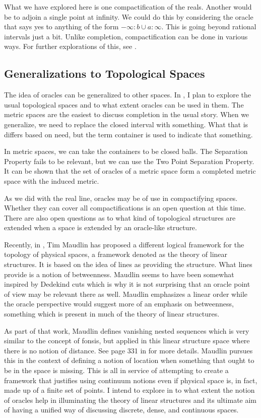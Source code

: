\documentclass[12pt]{article}
\begin{document}
What we have explored here is one compactification of the reals. Another would be to adjoin a single point at infinity. We could do this by considering the oracle that says yes to anything of the form $-\infty:b \cup a:\infty$. This is going beyond rational intervals just a bit. Unlike completion, compactification can be done in various ways. For further explorations of this, see \cite{taylor23metric}. 


\subsection{Generalizations to Topological Spaces}

The idea of oracles can be generalized to other spaces. In \cite{taylor23metric}, I plan to explore the usual topological spaces and to what extent oracles can be used in them. The metric spaces are the easiest to discuss completion in the usual story. When we generalize, we need to replace the closed interval with something. What that is differs based on need, but the term container is used to indicate that something. 

In metric spaces, we can take the containers to be closed balls. The Separation Property fails to be relevant, but we can use the Two Point Separation Property. It can be shown that the set of oracles of a metric space form a completed metric space with the induced metric. 

As we did with the real line, oracles may be of use in compactifying spaces. Whether they can cover all compactifications is an open question at this time. There are also open questions as to what kind of topological structures are extended when a space is extended by an oracle-like structure. 

Recently, in \cite{maudlin}, Tim Maudlin has proposed a different logical framework for the topology of physical spaces, a framework denoted as the theory of linear structures. It is based on the idea of lines as providing the structure. What lines provide is a notion of betweenness. Maudlin seems to have been somewhat inspired by Dedekind cuts which is why it is not surprising that an oracle point of view may be relevant there as well. Maudlin emphasizes a linear order while the oracle perspective would suggest more of an emphasis on betweenness, something which is present in much of the theory of linear structures. 

As part of that work, Maudlin defines vanishing nested sequences which is very similar to the concept of fonsis, but applied in this linear structure space where there is no notion of distance. See page 331 in \cite{maudlin} for more details. Maudlin pursues this in the context of defining a notion of location when something that ought to be in the space is missing. This is all in service of attempting to create a framework that justifies using continuum notions even if physical space is, in fact, made up of a finite set of points. I intend to explore in \cite{taylor23maudlin} to what extent the notion of oracles help in illuminating the theory of linear structures and its ultimate aim of having a unified way of discussing discrete, dense, and continuous spaces. 
\end{document}
